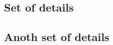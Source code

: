     \vspace{0.5em}
    \subsection{Set of details}
        \label{sec:setdetails}
        \lipsum[71-80]

    \vspace{0.5em}
    \subsection{Anoth set of details}
        \label{sec:anotherdetails}
        \lipsum[81-90]







